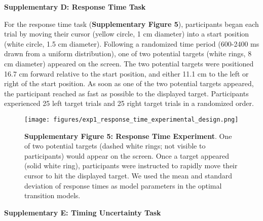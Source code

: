 \documentclass[12pt]{article}
\newcommand\boldblue[1]{\textcolor{mydarkblue}{\textbf{#1}}}
\begin{document}
\newpage
\noindent\boldblue{\large\textcolor{mydarkblue}{Supplementary D: Response Time Task}}

\noindent For the response time task (\boldblue{Supplementary Figure 5}), participants began each trial by moving their cursor (yellow circle, 1 cm diameter) into a start position (white circle, 1.5 cm diameter). Following a randomized time period (600-2400 ms drawn from a uniform distribution), one of two potential targets (white rings, 8 cm diameter) appeared on the screen. The two potential targets were positioned 16.7 cm forward relative to the start position, and either 11.1 cm to the left or right of the start position. As soon as one of the two potential targets appeared, the participant reached as fast as possible to the displayed target. Participants experienced 25 left target trials and 25 right target trials in a randomized order. 
\begin{figure}[H]
    \centering
    \texttt{[image: figures/exp1\_response\_time\_experimental\_design.png]}

    \caption*{\boldblue{Supplementary Figure 5: Response Time Experiment}. One of two potential targets (dashed white rings; not visible to participants) would appear on the screen. Once a target appeared (solid white ring), participants were instructed to rapidly move their cursor to hit the displayed target. We used the mean and standard deviation of response times as model parameters in the optimal transition models.}
\end{figure}

\newpage
\noindent\boldblue{\large\textcolor{mydarkblue}{Supplementary E: Timing Uncertainty Task}}
\end{document}
